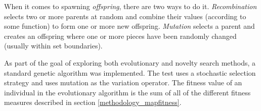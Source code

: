 When it comes to spawning \textit{offspring}, there are two ways to do it\cite[Chapter 2]{shaker2015procedural}. \textit{Recombination} selects two or more parents at random and combine their values (according to some function) to form one or more new offspring. \textit{Mutation} selects a parent and creates an offspring where one or more pieces have been randomly changed (usually within set boundaries). 

As part of the goal of exploring both evolutionary and novelty search methods, a standard genetic algorithm was implemented. The test uses a stochastic selection strategy and uses mutation as the variation operator. The fitness value of an individual in the evolutionary algorithm is the sum of all of the different fitness measures described in section \ref{methodology_mapfitness}.